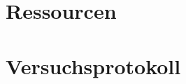 \documentclass[
    twoside=true, 
    footinclude=off, 
    captions=tableheading, 
    DIV=12;usenames,
    dvipsnames
]{scrbook}
\begin{document}
    \newpage
    \section{Ressourcen}
        

    \newpage
    \section{Versuchsprotokoll}
        




%
\end{document}
